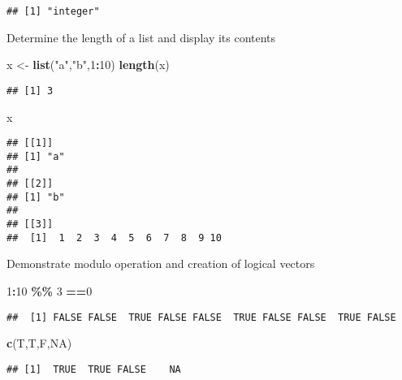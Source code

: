 \documentclass[
]{article}
\newenvironment{Shaded}{\begin{snugshade}}{\end{snugshade}}
\newcommand{\ConstantTok}[1]{\textcolor[rgb]{0.56,0.35,0.01}{#1}}
\newcommand{\DecValTok}[1]{\textcolor[rgb]{0.00,0.00,0.81}{#1}}
\newcommand{\FunctionTok}[1]{\textcolor[rgb]{0.13,0.29,0.53}{\textbf{#1}}}
\newcommand{\NormalTok}[1]{#1}
\newcommand{\OtherTok}[1]{\textcolor[rgb]{0.56,0.35,0.01}{#1}}
\newcommand{\SpecialCharTok}[1]{\textcolor[rgb]{0.81,0.36,0.00}{\textbf{#1}}}
\newcommand{\StringTok}[1]{\textcolor[rgb]{0.31,0.60,0.02}{#1}}
\begin{document}
\begin{verbatim}
## [1] "integer"
\end{verbatim}

Determine the length of a list and display its contents

\begin{Shaded}
\begin{Highlighting}[]
\NormalTok{x }\OtherTok{\textless{}{-}} \FunctionTok{list}\NormalTok{(}\StringTok{"a"}\NormalTok{,}\StringTok{"b"}\NormalTok{,}\DecValTok{1}\SpecialCharTok{:}\DecValTok{10}\NormalTok{)}
\FunctionTok{length}\NormalTok{(x)}
\end{Highlighting}
\end{Shaded}

\begin{verbatim}
## [1] 3
\end{verbatim}

\begin{Shaded}
\begin{Highlighting}[]
\NormalTok{x}
\end{Highlighting}
\end{Shaded}

\begin{verbatim}
## [[1]]
## [1] "a"
## 
## [[2]]
## [1] "b"
## 
## [[3]]
##  [1]  1  2  3  4  5  6  7  8  9 10
\end{verbatim}

Demonstrate modulo operation and creation of logical vectors

\begin{Shaded}
\begin{Highlighting}[]
\DecValTok{1}\SpecialCharTok{:}\DecValTok{10} \SpecialCharTok{\%\%} \DecValTok{3} \SpecialCharTok{==}\DecValTok{0}
\end{Highlighting}
\end{Shaded}

\begin{verbatim}
##  [1] FALSE FALSE  TRUE FALSE FALSE  TRUE FALSE FALSE  TRUE FALSE
\end{verbatim}

\begin{Shaded}
\begin{Highlighting}[]
\FunctionTok{c}\NormalTok{(T,T,F,}\ConstantTok{NA}\NormalTok{)}
\end{Highlighting}
\end{Shaded}

\begin{verbatim}
## [1]  TRUE  TRUE FALSE    NA
\end{verbatim}
\end{document}
